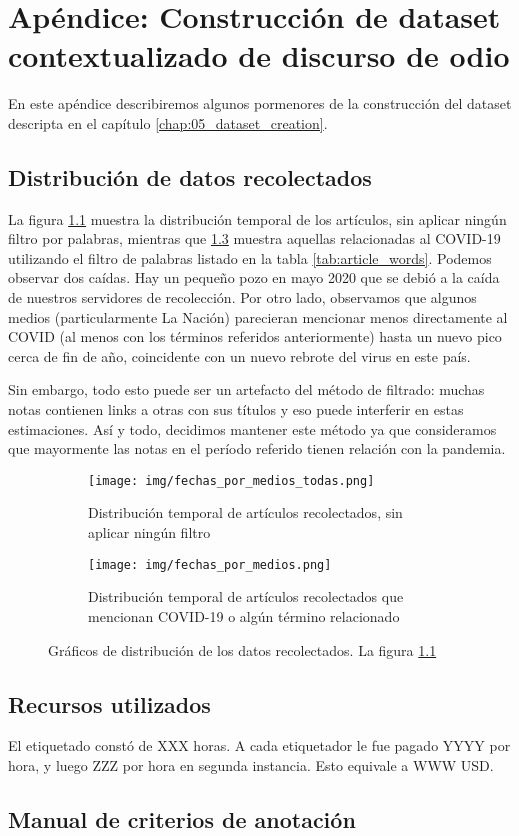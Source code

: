 \chapter{Apéndice: Construcción de dataset contextualizado de discurso de odio}

En este apéndice describiremos algunos pormenores de la construcción del dataset descripta en el capítulo \ref{chap:05_dataset_creation}.




\section{Distribución de datos recolectados}
\label{app:distribucion_datos}
La figura \ref{fig:fecha_articulos_por_medio_todas} muestra la distribución temporal de los artículos, sin aplicar ningún filtro por palabras, mientras que \ref{fig:fecha_articulos_por_medio_covid} muestra aquellas relacionadas al COVID-19 utilizando el filtro de palabras listado en la tabla \ref{tab:article_words}. Podemos observar dos caídas. Hay un pequeño pozo en mayo 2020 que se debió a la caída de nuestros servidores de recolección. Por otro lado, observamos que algunos medios (particularmente La Nación) parecieran mencionar menos directamente al COVID (al menos con los términos referidos anteriormente) hasta un nuevo pico cerca de fin de año, coincidente con un nuevo rebrote del virus en este país.

Sin embargo, todo esto puede ser un artefacto del método de filtrado: muchas notas contienen links a otras con sus títulos y eso puede interferir en estas estimaciones. Así y todo, decidimos mantener este método ya que consideramos que mayormente las notas en el período referido tienen relación con la pandemia.


\begin{figure}
    \centering
    \begin{subfigure}[t]{\textwidth}
        \texttt{[image: img/fechas\_por\_medios\_todas.png]}
        \caption{Distribución temporal de artículos recolectados, sin aplicar ningún filtro}
        \label{fig:fecha_articulos_por_medio_todas}
    \end{subfigure}

    \begin{subfigure}[t]{\textwidth}
        \texttt{[image: img/fechas\_por\_medios.png]}
        \caption{Distribución temporal de artículos recolectados que mencionan COVID-19 o algún término relacionado}
        \label{fig:fecha_articulos_por_medio_covid}
    \end{subfigure}

    \caption{Gráficos de distribución de los datos recolectados. La figura \ref{fig:fecha_articulos_por_medio_todas}}
\end{figure}


\section{Recursos utilizados}

El etiquetado constó de XXX horas. A cada etiquetador le fue pagado YYYY por hora, y luego ZZZ por hora en segunda instancia. Esto equivale a WWW USD.

\section{Manual de criterios de anotación}
\label{app:manual_criterios_anotacion}

